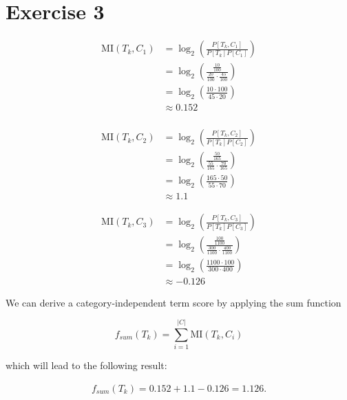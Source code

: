 \documentclass[a4paper]{article}
\newcommand{\mi}{\text{MI}}
\begin{document}
\section*{Exercise 3}
\begin{align*}
\mi(T_k, C_1) &= \log_2 \left( \frac{P[T_k,C_1]}{P[T_k] P[C_1]}\right) \\ 
&= \log_2 \left(\frac{\frac{10}{100}}{\frac{20}{100} \cdot \frac{45}{100}} \right) \\
&= \log_2 \left( \frac{10 \cdot 100}{45 \cdot 20}\right) \\
&\approx 0.152 \\
\end{align*}

\begin{align*}
\mi(T_k, C_2) &= \log_2 \left( \frac{P[T_k,C_2]}{P[T_k] P[C_2]}\right) \\ 
&= \log_2 \left(\frac{\frac{50}{165}}{\frac{55}{165} \cdot \frac{70}{165}} \right) \\
&= \log_2 \left( \frac{165 \cdot 50}{55 \cdot 70}\right) \\
&\approx 1.1
\end{align*}

\begin{align*}
\mi(T_k, C_3) &= \log_2 \left( \frac{P[T_k,C_3]}{P[T_k] P[C_3]}\right) \\ 
&= \log_2 \left(\frac{\frac{100}{1100}}{\frac{300}{1100} \cdot \frac{400}{1100}} \right) \\
&= \log_2 \left( \frac{1100 \cdot 100}{300 \cdot 400}\right) \\
&\approx -0.126
\end{align*}

We can derive a category-independent term score by applying the sum function 

$$f_{sum}(T_k) = \sum_{i=1}^{|C|} \mi(T_k,C_i)$$

which will lead to the following result:

\begin{align*}
 f_{sum}(T_k) = 0.152 + 1.1 - 0.126 = 1.126.
\end{align*}
\end{document}
